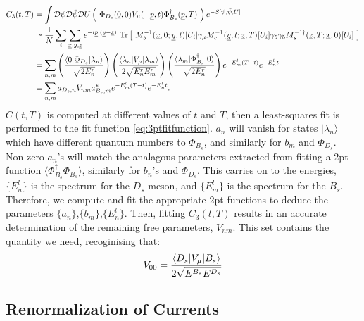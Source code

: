 \begin{align}
	C_3(t,T) &= \int \mathcal{D}\psi \mathcal{D}\bar{\psi} \mathcal{D}U \left(\text{ } \Phi_{D_s}(\underline{0},0) V_{\mu}(-\underline{p},t) \Phi_{B_s}^{\dagger}(\underline{p},T) \text{ }\right) e^{-S[\psi,\bar{\psi},U]} \\
	&\simeq {1\over N} \sum_i \sum_{\underline{x},\underline{y},\underline{z}} e^{-i\underline{p}\cdot (\underline{y}-\underline{z})} \text{ Tr}\left[\text{ } M^{-1}_b(\underline{x},0;\underline{y},t)[U_i] \gamma_{\mu} M^{-1}_c(\underline{y},t;\underline{z},T)[U_i]\gamma_5\gamma_5 M_s^{-1\dagger}(\underline{z},T;\underline{x},0)[U_i]  \text{ }\right] \\	
	&= \sum_{n,m}  \left( {\langle 0 | \Phi_{D_s} | \lambda_n \rangle \over \sqrt{2E^r_n}} \right) \left({\langle \lambda_n | V_{\mu} | \lambda_m \rangle \over 2\sqrt{ E^r_n E^r_m } }\right) \left( {\langle \lambda_m | \Phi_{B_s}^{\dagger} | 0 \rangle \over \sqrt{2E^r_n} } \right) e^{-E^l_m (T-t)} e^{-E^l_n t} \\
	\nonumber
	& \equiv \sum_{n,m} a_{D_s,n} V_{nm} a^*_{B_s,m} e^{-E^l_m (T-t)} e^{-E^l_n t}.
	\label{eq:3ptfitfunction}
\end{align}
$C(t,T)$ is computed at different values of $t$ and $T$, then a least-squares fit is performed to the fit function \eqref{eq:3ptfitfunction}. $a_n$ will vanish for states $|\lambda_n\rangle$ which have different quantum numbers to $\Phi_{B_s}$, and similarly for $b_m$ and $\Phi_{D_s}$. Non-zero $a_n$'s will match the analagous parameters extracted from fitting a 2pt function $\langle \Phi_{B_s}^{\dagger} \Phi_{B_s} \rangle$, similarly for $b_n$'s and $\Phi_{D_s}$. This carries on to the energies, $\{E^l_n\}$ is the spectrum for the $D_s$ meson, and $\{E^l_m\}$ is the spectrum for the $B_s$. Therefore, we compute and fit the appropriate 2pt functions to deduce the parameters $\{a_n\}$,$\{b_m\}$,$\{E^l_n\}$. Then, fitting $C_3(t,T)$ results in an accurate determination of the remaining free parameters, $V_{nm}$. This set contains the quantity we need, recoginising that:
\begin{align}
	V_{00} = {\langle D_s | V_{\mu} | B_s \rangle \over 2\sqrt{E^{B_s} E^{D_s} } }
\end{align}

\subsection{Renormalization of Currents}
\label{sec:renormalization}

